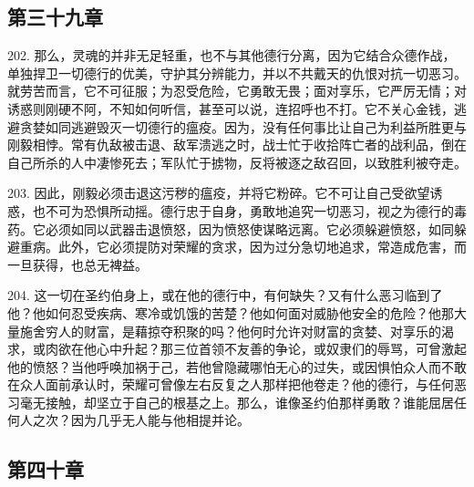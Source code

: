 
\subsection{第三十九章}

\par

202. 那么，灵魂的并非无足轻重，也不与其他德行分离，因为它结合众德作战，单独捍卫一切德行的优美，守护其分辨能力，并以不共戴天的仇恨对抗一切恶习。就劳苦而言，它不可征服；为忍受危险，它勇敢无畏；面对享乐，它严厉无情；对诱惑则刚硬不阿，不知如何听信，甚至可以说，连招呼也不打。它不关心金钱，逃避贪婪如同逃避毁灭一切德行的瘟疫。因为，没有任何事比让自己为利益所胜更与刚毅相悖。常有仇敌被击退、敌军溃逃之时，战士忙于收拾阵亡者的战利品，倒在自己所杀的人中凄惨死去；军队忙于掳物，反将被逐之敌召回，以致胜利被夺走。\par

203. 因此，刚毅必须击退这污秽的瘟疫，并将它粉碎。它不可让自己受欲望诱惑，也不可为恐惧所动摇。德行忠于自身，勇敢地追究一切恶习，视之为德行的毒药。它必须如同以武器击退愤怒，因为愤怒使谋略远离。它必须躲避愤怒，如同躲避重病。此外，它必须提防对荣耀的贪求，因为过分急切地追求，常造成危害，而一旦获得，也总无裨益。\par

204. 这一切在圣约伯身上，或在他的德行中，有何缺失？又有什么恶习临到了他？他如何忍受疾病、寒冷或饥饿的苦楚？他如何面对威胁他安全的危险？他那大量施舍穷人的财富，是藉掠夺积聚的吗？他何时允许对财富的贪婪、对享乐的渴求，或肉欲在他心中升起？那三位首领不友善的争论，或奴隶们的辱骂，可曾激起他的愤怒？当他呼唤加祸于己，若他曾隐藏哪怕无心的过失，或因惧怕众人而不敢在众人面前承认时，荣耀可曾像左右反复之人那样把他卷走？他的德行，与任何恶习毫无接触，却坚立于自己的根基之上。那么，谁像圣约伯那样勇敢？谁能屈居任何人之次？因为几乎无人能与他相提并论。\par


\subsection{第四十章}

\par

